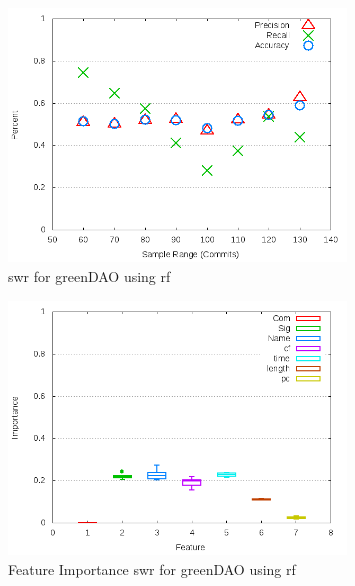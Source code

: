 \begin{figure}[!t]
\centering
\includegraphics[width=0.8\textwidth]{images/rf/test_1/greenDAO_sample_range.png}
\caption{\gls{swr} for greenDAO using \gls{rf}}
\label{fig:test_1_greenDAO_rf}
\end{figure}

\begin{figure}[!t]
\centering
\includegraphics[width=0.8\textwidth]{images/rf/test_1/greenDAO_importance.png}
\caption{Feature Importance \gls{swr} for greenDAO using \gls{rf}}
\label{fig:test_1_greenDAO_rf_importance}
\end{figure}


